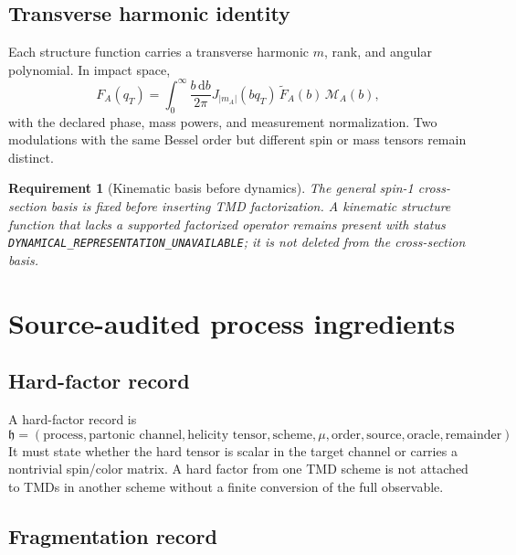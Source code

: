 \documentclass[11pt]{article}
\newtheorem{requirement}[definition]{Requirement}
\newcommand{\dd}{\mathrm{d}}
\newcommand{\cM}{\mathcal M}
\begin{document}
\subsection{Transverse harmonic identity}

Each structure function carries a transverse harmonic \(m\), rank, and angular polynomial.  In impact space,
\begin{equation}
 F_A(q_T)=
 \int_0^\infty\frac{b\,\dd b}{2\pi}
 J_{|m_A|}(bq_T)\,
 \widetilde F_A(b)\,
 \cM_A(b),
 \label{eq:harmonic-transform}
\end{equation}
with the declared phase, mass powers, and measurement normalization.  Two modulations with the same Bessel order but different spin or mass tensors remain distinct.

\begin{requirement}[Kinematic basis before dynamics]
The general spin-1 cross-section basis is fixed before inserting TMD factorization.  A kinematic structure function that lacks a supported factorized operator remains present with status \texttt{DYNAMICAL\_REPRESENTATION\_UNAVAILABLE}; it is not deleted from the cross-section basis.
\end{requirement}

\section{Source-audited process ingredients}
\label{sec:sources}

\subsection{Hard-factor record}

A hard-factor record is
\begin{equation}
 \mathfrak h=
 \left(
 \text{process},
 \text{partonic channel},
 \text{helicity tensor},
 \text{scheme},
 \mu,
 \text{order},
 \text{source},
 \text{oracle},
 \text{remainder}
 \right).
 \label{eq:hard-record}
\end{equation}
It must state whether the hard tensor is scalar in the target channel or carries a nontrivial spin/color matrix.  A hard factor from one TMD scheme is not attached to TMDs in another scheme without a finite conversion of the full observable.

\subsection{Fragmentation record}
\end{document}
